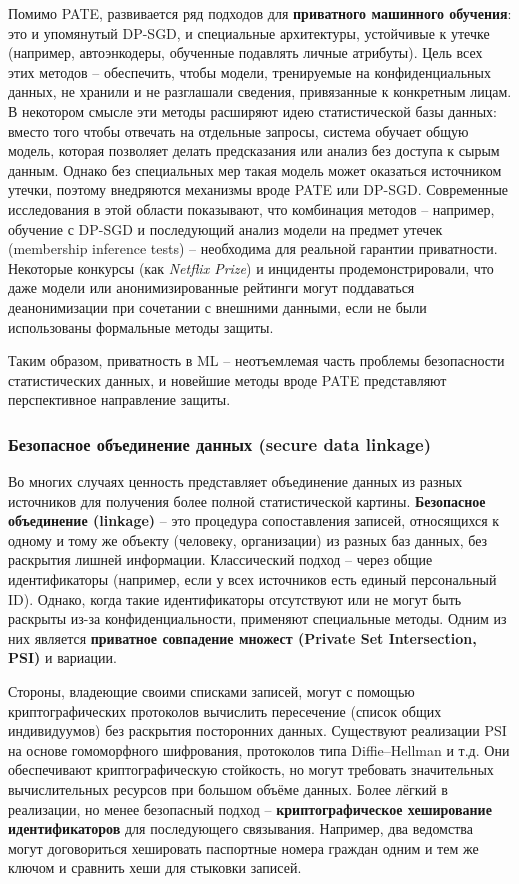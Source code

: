 Помимо PATE, развивается ряд подходов для \textbf{приватного
машинного обучения}: это и упомянутый DP-SGD, и специальные архитектуры, устойчивые к утечке (например, автоэнкодеры,
обученные подавлять личные атрибуты). Цель всех этих методов – обеспечить, чтобы модели, тренируемые на конфиденциальных
данных, не хранили и не разглашали сведения, привязанные к конкретным лицам. В некотором смысле эти методы расширяют
идею статистической базы данных: вместо того чтобы отвечать на отдельные запросы, система обучает общую модель, которая
позволяет делать предсказания или анализ без доступа к сырым данным. Однако без специальных мер такая модель может
оказаться источником утечки, поэтому внедряются механизмы вроде PATE или DP-SGD. Современные исследования в этой области
показывают, что комбинация методов – например, обучение с DP-SGD и последующий анализ модели на предмет утечек
(membership inference tests) – необходима для реальной гарантии приватности. Некоторые конкурсы (как \textit{Netflix
Prize}) и инциденты продемонстрировали, что даже модели или анонимизированные рейтинги могут поддаваться деанонимизации
при сочетании с внешними данными, если не были использованы формальные методы защиты.

Таким образом, приватность в ML –
неотъемлемая часть проблемы безопасности статистических данных, и новейшие методы вроде PATE представляют перспективное
направление защиты.

\subsubsection{Безопасное объединение данных (secure data linkage)}

Во многих случаях ценность представляет объединение данных из разных источников для получения более полной
статистической картины. \textbf{Безопасное объединение (linkage)} – это процедура сопоставления записей, относящихся к
одному и тому же объекту (человеку, организации) из разных баз данных, без раскрытия лишней информации. Классический
подход – через общие идентификаторы (например, если у всех источников есть единый персональный ID). Однако, когда такие
идентификаторы отсутствуют или не могут быть раскрыты из-за конфиденциальности, применяют специальные методы. Одним из
них является \textbf{приватное совпадение множест (Private Set Intersection, PSI)} и вариации.

Стороны, владеющие своими списками записей, могут с помощью криптографических протоколов вычислить пересечение (список общих индивидуумов) 
без раскрытия посторонних данных. Существуют реализации PSI на основе гомоморфного шифрования, протоколов типа
Diffie–Hellman и т.д. Они обеспечивают криптографическую стойкость, но могут требовать значительных вычислительных
ресурсов при большом объёме данных. Более лёгкий в реализации, но менее безопасный подход – \textbf{криптографическое
хеширование идентификаторов} для последующего связывания. Например, два ведомства могут договориться хешировать
паспортные номера граждан одним и тем же ключом и сравнить хеши для стыковки записей.

